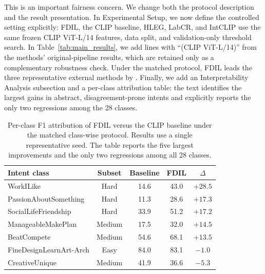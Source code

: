
{This is an important fairness concern. We change both the protocol description and the result presentation. In Experimental Setup, we now define the controlled setting explicitly: FDIL, the CLIP baseline, HLEG, LabCR, and IntCLIP use the same frozen CLIP ViT-L/14 features, data split, and validation-only threshold search. In Table~\ref{tab:main_results}, we add lines with ``(CLIP ViT-L/14)'' from the methods' original-pipeline results, which are retained only as a complementary robustness check. Under the matched protocol, FDIL leads the three representative external methods by . Finally, we add an Interpretability Analysis subsection and a per-class attribution table: the text identifies the largest gains in abstract, disagreement-prone intents and explicitly reports the only two regressions among the 28 classes.

\begin{table}[h]
\centering
\caption{Per-class F1 attribution of FDIL versus the CLIP baseline under the
matched class-wise protocol. Results use a single representative seed. The
table reports the five largest improvements and the only two regressions among
all 28 classes.}
\label{tab:per_class_attr}
\begin{tabular}{lcccc}
\toprule
Intent class & Subset & Baseline & FDIL & $\Delta$ \\
\midrule
WorkILike & Hard & 14.6 & 43.0 & $+28.5$ \\
PassionAboutSomething & Hard & 11.3 & 28.6 & $+17.3$ \\
SocialLifeFriendship & Hard & 33.9 & 51.2 & $+17.2$ \\
ManageableMakePlan & Medium & 17.5 & 32.0 & $+14.5$ \\
BeatCompete & Medium & 54.6 & 68.1 & $+13.5$ \\
\midrule
FineDesignLearnArt-Arch & Easy & 84.0 & 83.1 & $-1.0$ \\
CreativeUnique & Medium & 41.9 & 36.6 & $-5.3$ \\
\bottomrule
\end{tabular}
\end{table}
}
\showMainResults

